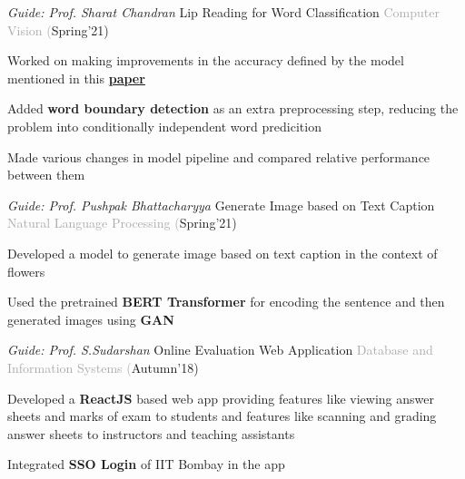 \begin{cventries}
  \cventry
    {\textit{Guide: Prof. Sharat Chandran}}
    {Lip Reading for Word Classification}
    {\textcolor{darkgray} {Computer Vision}}
    {\fontsize{9pt}{1em} \textcolor{darkgray}(Spring'21)}
    {
      \begin{cvitems}
        \item Worked on making improvements in the accuracy defined by the model mentioned in this \href{http://cs231n.stanford.edu/reports/2017/pdfs/227.pdf}{\textbf{paper}} \vspace{0.25mm}
        \item Added \textbf{word boundary detection} as an extra preprocessing step, reducing the problem into conditionally independent word predicition \vspace{0.25mm}
        \item Made various changes in model pipeline and compared relative performance between them \vspace{-1mm}
      \end{cvitems}
    }
    \cventry
    {\textit{Guide: Prof. Pushpak Bhattacharyya}}
    {Generate Image based on Text Caption}
    {\textcolor{darkgray} {Natural Language Processing}}
    {\fontsize{9pt}{1em} \textcolor{darkgray}(Spring'21)}
    {
      \begin{cvitems}
        \item Developed a model to generate image based on text caption in the context of flowers \vspace{0.25mm}
        \item Used the pretrained \textbf{BERT Transformer} for encoding the sentence and then generated images using \textbf{GAN} \vspace{-1mm}
      \end{cvitems}
    }
  \cventry
    {\textit{Guide: Prof. S.Sudarshan}}
    {Online Evaluation Web Application}
    {\textcolor{darkgray} {Database and Information Systems}}
    {\fontsize{9pt}{1em} \textcolor{darkgray}(Autumn'18)}
    {
      \begin{cvitems}
        \item Developed a \textbf{ReactJS} based web app providing features like viewing answer sheets and marks of exam to students and features like scanning and grading answer sheets to instructors and teaching assistants \vspace{0.25mm}
        \item Integrated \textbf{SSO Login} of IIT Bombay in the app \vspace{0.25mm}

\end{cvitems}}
\end{cventries}
